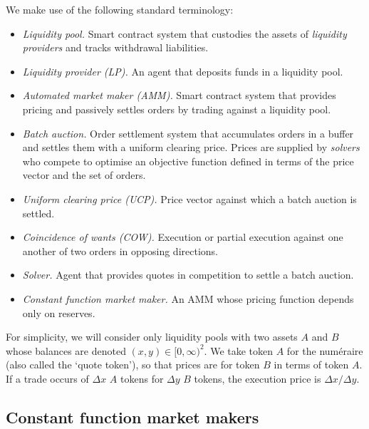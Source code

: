 \documentclass[a4paper,10pt]{article}
\theoremstyle{remark}
\begin{document}
We make use of the following standard terminology:
\begin{itemize}

  \item \emph{Liquidity pool.} Smart contract system that custodies the assets of \emph{liquidity providers} and tracks withdrawal liabilities.
  
  \item \emph{Liquidity provider (LP).} An agent that deposits funds in a liquidity pool.
  
  \item \emph{Automated market maker (AMM).} Smart contract system that provides pricing and passively settles orders by trading against a liquidity pool.
  
  \item \emph{Batch auction.} Order settlement system that accumulates orders in a buffer and settles them with a uniform clearing price.
  Prices are supplied by \emph{solvers} who compete to optimise an objective function defined in terms of the price vector and the set of orders.
  
  \item \emph{Uniform clearing price (UCP).} Price vector against which a batch auction is settled.
  
  \item \emph{Coincidence of wants (COW).} Execution or partial execution against one another of two orders in opposing directions. 
  
  \item \emph{Solver.} Agent that provides quotes in competition to settle a batch auction.
  
  \item \emph{Constant function market maker.} An AMM whose pricing function depends only on reserves.
  
\end{itemize}

For simplicity, we will consider only liquidity pools with two assets $A$ and $B$ whose balances are denoted $(x,y)\in [0,\infty)^2$.
%
We take token $A$ for the num\'eraire (also called the `quote token'), so that prices are for token $B$ in terms of token $A$.
%
If a trade occurs of $\Delta x$ $A$ tokens for $\Delta y$ $B$ tokens, the execution price is $\Delta x/\Delta y$.

\subsection{Constant function market makers}
\end{document}
